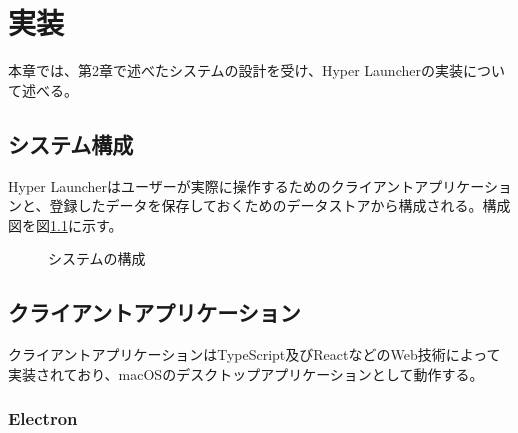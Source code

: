 \chapter{実装}

本章では、第2章で述べたシステムの設計を受け、Hyper Launcherの実装について述べる。

\newpage

\section{システム構成}

Hyper Launcherはユーザーが実際に操作するためのクライアントアプリケーションと、登録したデータを保存しておくためのデータストアから構成される。構成図を図\ref{fig:system}に示す。

\begin{figure}[h]
    \begin{center}
    \end{center}
    \caption{システムの構成}
    \label{fig:system}
\end{figure}

\section{クライアントアプリケーション}

クライアントアプリケーションはTypeScript及びReactなどのWeb技術によって実装されており、macOSのデスクトップアプリケーションとして動作する。

\subsection{Electron}

